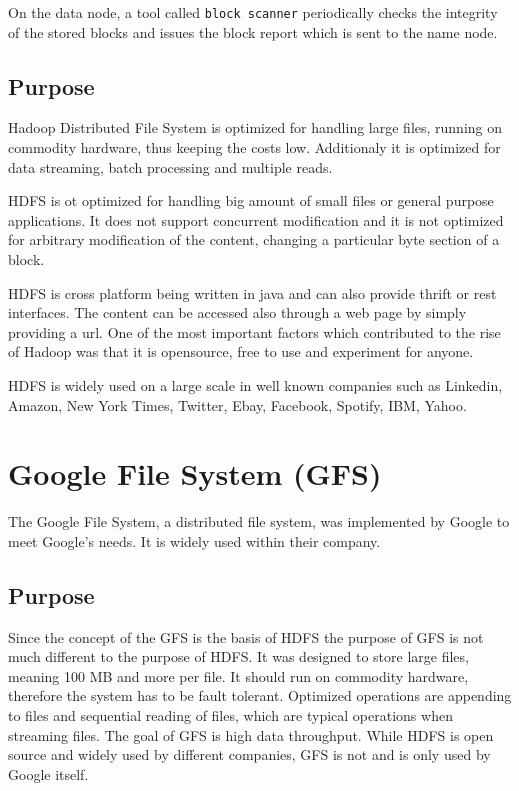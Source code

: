 \documentclass{sig-alternate}
\begin{document}
On the data node, a tool called \texttt{block scanner} periodically checks the integrity of the stored blocks and issues the block report which is sent to the name node.

\subsection{Purpose}
Hadoop Distributed File System is optimized for
handling large files, running on commodity hardware, thus keeping the costs low.
Additionaly it is optimized for data streaming, batch processing
and multiple reads.

HDFS is ot optimized for handling
big amount of small files or general purpose applications.
It does not support concurrent modification and it is not optimized for arbitrary modification of the content, changing a particular byte section of a block.

HDFS is cross platform being written in java and can also provide thrift or rest interfaces. The content can be accessed also through a web page by simply providing a url. One of the most important factors which contributed to the rise of Hadoop was that it is 
opensource, free to use and experiment for anyone.

HDFS is widely used on a large scale in well known companies such as  Linkedin, Amazon, New York Times, Twitter, Ebay, Facebook, Spotify, IBM, Yahoo.


\section{Google File System (GFS)}
The Google File System, a distributed file system, was implemented by Google to meet Google's needs. It is widely used within their company.
\subsection{Purpose}
Since the concept of the GFS is the basis of HDFS the purpose of GFS is not much different to the purpose of HDFS. It was designed to store large files, meaning 100 MB and more per file. It should run on commodity hardware, therefore the system has to be fault tolerant. Optimized operations are appending to files and sequential reading of files, which are typical operations when streaming files. The goal of GFS is high data throughput.
While HDFS is open source and widely used by different companies, GFS is not and is only used by Google itself.
\end{document}
